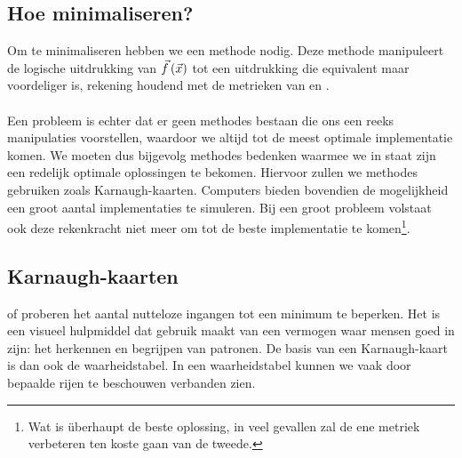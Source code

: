 \subsection{Hoe minimaliseren?}
Om te minimaliseren hebben we een methode nodig. Deze methode manipuleert de logische uitdrukking van $\vec{f}\left( \vec{x} \right)$ tot een uitdrukking die equivalent maar voordeliger is, rekening houdend met de metrieken van  en .

\paragraph{}
Een probleem is echter dat er geen methodes bestaan die ons een reeks manipulaties voorstellen, waardoor we altijd tot de meest optimale implementatie komen. We moeten dus bijgevolg methodes bedenken waarmee we in staat zijn een redelijk optimale oplossingen te bekomen. Hiervoor zullen we methodes gebruiken zoals Karnaugh-kaarten. Computers bieden bovendien de mogelijkheid een groot aantal implementaties te simuleren. Bij een groot probleem volstaat ook deze rekenkracht niet meer om tot de beste implementatie te komen\footnote{Wat is \"uberhaupt de beste oplossing, in veel gevallen zal de ene metriek verbeteren ten koste gaan van de tweede.}.

\subsection{Karnaugh-kaarten}
 of  proberen het aantal nutteloze ingangen tot een minimum te beperken. Het is een visueel hulpmiddel dat gebruik maakt van een vermogen waar mensen goed in zijn: het herkennen en begrijpen van patronen. De basis van een Karnaugh-kaart is dan ook de waarheidstabel. In een waarheidstabel kunnen we vaak door bepaalde rijen te beschouwen verbanden zien.

